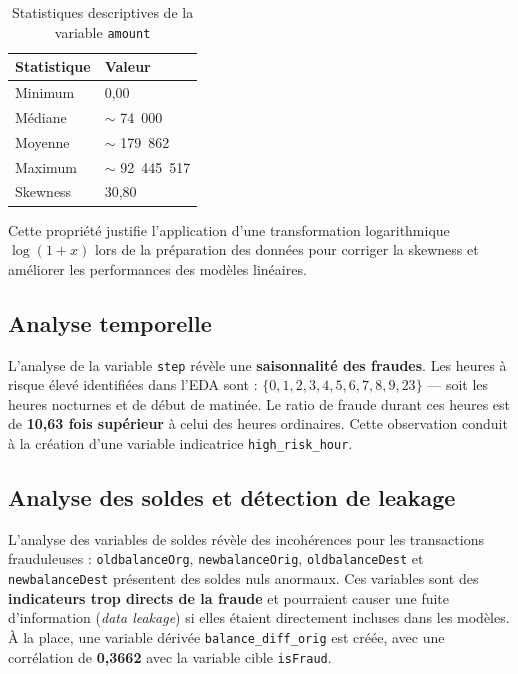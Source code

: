 \begin{table}[H]
\centering
\caption{Statistiques descriptives de la variable \texttt{amount}}
\label{tab:amount_stats}
\begin{tabular}{ll}
\toprule
\textbf{Statistique} & \textbf{Valeur} \\
\midrule
Minimum     & 0,00 \\
Médiane     & $\sim$ 74~000 \\
Moyenne     & $\sim$ 179~862 \\
Maximum     & $\sim$ 92~445~517 \\
Skewness    & 30,80 \\
\bottomrule
\end{tabular}
\end{table}

Cette propriété justifie l'application d'une transformation logarithmique
$\log(1 + x)$ lors de la préparation des données pour corriger la skewness et
améliorer les performances des modèles linéaires.

\subsection{Analyse temporelle}

L'analyse de la variable \texttt{step} révèle une \textbf{saisonnalité des fraudes}.
Les heures à risque élevé identifiées dans l'EDA sont :
$\{0, 1, 2, 3, 4, 5, 6, 7, 8, 9, 23\}$ --- soit les heures nocturnes et
de début de matinée. Le ratio de fraude durant ces heures est de \textbf{10,63 fois
supérieur} à celui des heures ordinaires. Cette observation conduit à la création d'une
variable indicatrice \texttt{high\_risk\_hour}.

\subsection{Analyse des soldes et détection de leakage}

L'analyse des variables de soldes révèle des incohérences pour les transactions frauduleuses :
\texttt{oldbalanceOrg}, \texttt{newbalanceOrig}, \texttt{oldbalanceDest} et
\texttt{newbalanceDest} présentent des soldes nuls anormaux. Ces variables sont des
\textbf{indicateurs trop directs de la fraude} et pourraient causer une fuite
d'information (\textit{data leakage}) si elles étaient directement incluses dans les
modèles. À la place, une variable dérivée \texttt{balance\_diff\_orig} est créée, avec
une corrélation de \textbf{0,3662} avec la variable cible \texttt{isFraud}.

